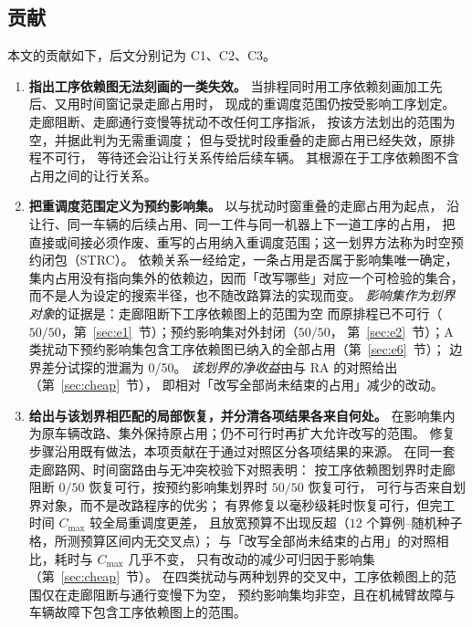 \documentclass[manuscript,screen,review]{acmart}
\providecommand{\STRC}{\textsc{STRC}}
\newcommand{\NPairs}{50}
\newcommand{\PassMiss}{\NPairs/\NPairs}      %
\newcommand{\FeasRone}{0/\NPairs}            %
\newcommand{\FeasRtwo}{\NPairs/\NPairs}      %
\newcommand{\PassClosed}{\NPairs/\NPairs}    %
\newcommand{\EfiveCells}{12}        %
\newcommand{\ProbeLeakPairs}{0/50}
\begin{document}
\subsection{贡献}
\label{sec:contributions}

本文的贡献如下，后文分别记为 C1、C2、C3。

\begin{enumerate}[label=\textbf{C\arabic*.},leftmargin=2.2em,itemsep=0.4em]
\item \textbf{指出工序依赖图无法刻画的一类失效。}
当排程同时用工序依赖刻画加工先后、又用时间窗记录走廊占用时，
现成的重调度范围仍按受影响工序划定。
走廊阻断、走廊通行变慢等扰动不改任何工序指派，
按该方法划出的范围为空，并据此判为无需重调度；
但与受扰时段重叠的走廊占用已经失效，原排程不可行，
等待还会沿让行关系传给后续车辆。
其根源在于工序依赖图不含占用之间的让行关系。

\item \textbf{把重调度范围定义为预约影响集。}
以与扰动时窗重叠的走廊占用为起点，
沿让行、同一车辆的后续占用、同一工件与同一机器上下一道工序的占用，
把直接或间接必须作废、重写的占用纳入重调度范围；这一划界方法称为时空预约闭包（\STRC）。
依赖关系一经给定，一条占用是否属于影响集唯一确定，
集内占用没有指向集外的依赖边，因而「改写哪些」对应一个可检验的集合，
而不是人为设定的搜索半径，也不随改路算法的实现而变。
\emph{影响集作为划界对象}的证据是：走廊阻断下工序依赖图上的范围为空
而原排程已不可行（\(\PassMiss\)，第~\ref{sec:e1}~节）；预约影响集对外封闭（\(\PassClosed\)，
第~\ref{sec:e2}~节）；A 类扰动下预约影响集包含工序依赖图已纳入的全部占用（第~\ref{sec:e6}~节）；
边界差分试探的泄漏为 \ProbeLeakPairs。
\emph{该划界的净收益}由与 RA 的对照给出（第~\ref{sec:cheap}~节），
即相对「改写全部尚未结束的占用」减少的改动。

\item \textbf{给出与该划界相匹配的局部恢复，并分清各项结果各来自何处。}
在影响集内为原车辆改路、集外保持原占用；仍不可行时再扩大允许改写的范围。
修复步骤沿用既有做法，本项贡献在于通过对照区分各项结果的来源。
在同一套走廊路网、时间窗路由与无冲突校验下对照表明：
按工序依赖图划界时走廊阻断 \(\FeasRone\) 恢复可行，按预约影响集划界时 \(\FeasRtwo\) 恢复可行，
可行与否来自划界对象，而不是改路程序的优劣；
有界修复以毫秒级耗时恢复可行，但完工时间 \(C_{\max}\) 较全局重调度更差，
且放宽预算不出现反超（\(\EfiveCells\) 个算例--随机种子格，所测预算区间内无交叉点）；
与「改写全部尚未结束的占用」的对照相比，耗时与 \(C_{\max}\) 几乎不变，
只有改动的减少可归因于影响集（第~\ref{sec:cheap}~节）。
在四类扰动与两种划界的交叉中，工序依赖图上的范围仅在走廊阻断与通行变慢下为空，
预约影响集均非空，且在机械臂故障与车辆故障下包含工序依赖图上的范围。
\end{enumerate}
\end{document}
